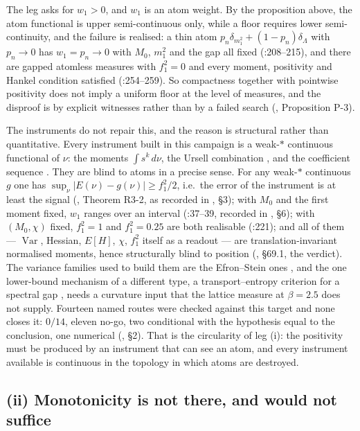 The leg asks for $w_1>0$, and $w_1$ is an atom weight. By the proposition above, the atom functional
is upper semi-continuous only, while a floor requires lower semi-continuity, and the failure is
realised: a thin atom $p_n\delta_{m_1^2}+(1-p_n)\delta_\Lambda$ with $p_n\to0$ has $w_1=p_n\to0$ with
$M_0$, $m_1^2$ and the gap all fixed (:208--215), and there are gapped
atomless measures with $f_1^2=0$ and every moment, positivity and Hankel condition satisfied
(:254--259). So compactness together with pointwise positivity does not
imply a uniform floor at the level of measures, and the disproof is by explicit witnesses rather
than by a failed search (, Proposition P-3).

The instruments do not repair this, and the reason is structural rather than quantitative. Every
instrument built in this campaign is a weak-$*$ continuous functional of $\nu$: the moments
$\int s^k\,d\nu$, the Ursell combination , and the coefficient sequence
. They are blind to atoms in a precise sense. For any weak-$*$
continuous $g$ one has $\sup_\nu|E(\nu)-g(\nu)|\ge f_1^2/2$, i.e.\ the error of the instrument is at
least the signal (, Theorem R3-2, as recorded in , \S3);
with $M_0$ and the first moment fixed, $w_1$ ranges over an interval
(:37--39, recorded in , \S6); with $(M_0,\chi)$ fixed, $f_1^2=1$
and $f_1^2=0.25$ are both
realisable (:221); and all of them --- $\operatorname{Var}$, Hessian, $E[H]$,
$\chi$, $f_1^2$ itself as a readout --- are translation-invariant normalised moments, hence
structurally blind to position (, \S69.1, the  verdict). The
variance families used to build them are the Efron--Stein ones \cite{es}, and the one lower-bound
mechanism of a different type, a transport--entropy criterion for a spectral gap \cite{vrs}, needs a
curvature input that the lattice measure at $\beta=2.5$ does not supply. Fourteen
named routes were checked against this target and none closes it: $0/14$, eleven no-go, two
conditional with the hypothesis equal to the conclusion, one numerical
(, \S2). That is the circularity of leg (i): the positivity must be
produced by an instrument that can see an atom, and every instrument available is continuous in the
topology in which atoms are destroyed.

\subsection{(ii) Monotonicity is not there, and would not suffice}

